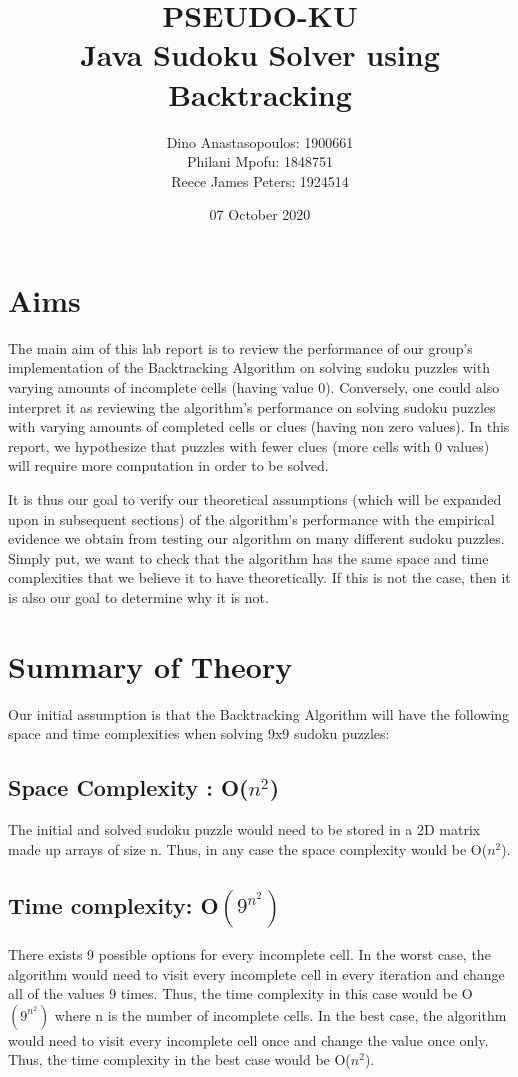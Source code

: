 \documentclass{article}
\author{
  Dino Anastasopoulos: 1900661 \\
  Philani Mpofu: 1848751\\
  Reece James Peters: 1924514
}
\title{
  PSEUDO-KU\\
  Java Sudoku Solver using Backtracking
}
\date{07 October 2020}
\begin{document}
    \begin{titlepage}
        \maketitle{}
    \end{titlepage}
    
    \tableofcontents

    \pagebreak 
    \section{Aims}
    The main aim of this lab report is to review the performance of our group’s implementation of the Backtracking Algorithm on solving sudoku puzzles with varying amounts of incomplete cells (having value 0). Conversely, one could also interpret it as reviewing the algorithm’s performance on solving sudoku puzzles with varying amounts of completed cells or clues (having non zero values). In this report, we hypothesize that puzzles with fewer clues (more cells with 0 values) will require more computation in order to be solved.


    It is thus our goal to verify our theoretical assumptions (which will be expanded upon in subsequent sections) of the algorithm’s performance with the empirical evidence we obtain from testing our algorithm on many different sudoku puzzles. Simply put, we want to check that the algorithm has the same space and time complexities that we believe it to have theoretically. If this is not the case, then it is also our goal to determine why it is not. 


    \section{Summary of Theory}
    Our initial assumption is that the Backtracking Algorithm will have the following space and time complexities when solving 9x9 sudoku puzzles:


    \subsection{Space Complexity : O($n^2$)}
    The initial and solved sudoku puzzle would need to be stored in a 2D matrix made up arrays of size n. Thus, in any case the space complexity would be O($n^2$). \cite{GeeksforGeeks}


    \subsection{Time complexity: O$(9^{n^2})$} 
    There exists 9 possible options for every incomplete cell. In the worst case, the algorithm would need to visit every incomplete cell in every iteration and change all of the values 9 times. Thus, the time complexity in this case would be O$(9^{n^2})$ where n is the number of incomplete cells. In the best case, the algorithm would need to visit every incomplete cell once and change the value once only. Thus, the time complexity in the best case would be O($n^2$). \cite{GeeksforGeeks}
    
\end{document}
